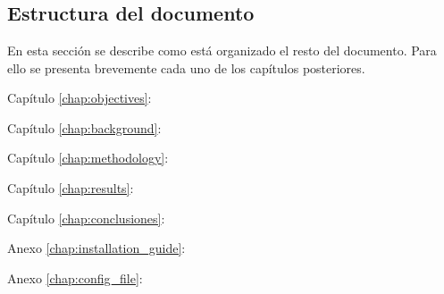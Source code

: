 \chapter{} %



\section{Estructura del documento}
En esta sección se describe como está organizado el resto del documento. Para ello se presenta brevemente cada uno de los capítulos posteriores.

\begin{definitionlist}
	\item[Capítulo \ref{chap:objectives}: \nameref{chap:objectives}] 
	
	\item[Capítulo \ref{chap:background}: \nameref{chap:background}] 
	
	\item[Capítulo \ref{chap:methodology}: \nameref{chap:methodology}] 
	
	\item[Capítulo \ref{chap:results}: \nameref{chap:results}] 
	
	\item[Capítulo \ref{chap:conclusiones}: \nameref{chap:conclusiones}] 
	
	\item[Anexo \ref{chap:installation_guide}: \nameref{chap:installation_guide}] 
	
	\item[Anexo \ref{chap:config_file}: \nameref{chap:config_file}] 
	
\end{definitionlist}
